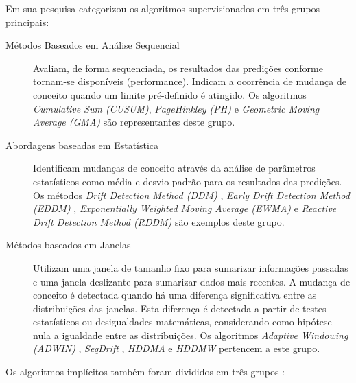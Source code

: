 \documentclass[qual, classic, a4paper]{ufbathesis}
\begin{document}
Em sua pesquisa \cite{Gama:2014:SCD:2597757.2523813} categorizou os algoritmos supervisionados em três grupos principais:

\begin{description}
    \item[Métodos Baseados em Análise Sequencial] Avaliam, de forma sequenciada, os resultados das predições conforme tornam-se disponíveis (performance).
    Indicam a ocorrência de mudança de conceito quando um limite pré-definido é atingido.
    Os algoritmos \textit{Cumulative Sum (CUSUM)}, \textit{PageHinkley (PH)} \cite{Page:CUSUM:PageHinkley:1954} e \textit{Geometric Moving Average (GMA)} \cite{Roberts:2000:CCT:338441.338464}
    são representantes deste grupo.

    \item[Abordagens baseadas em Estatística] Identificam mudanças de conceito através da análise de parâmetros estatísticos como média e desvio padrão para os resultados das predições.
    Os métodos \textit{Drift Detection Method (DDM)} \cite{GamaMCR04}, 
    \textit{Early Drift Detection Method (EDDM)} \cite{EDDM}, 
    \textit{Exponentially Weighted Moving Average (EWMA)} \cite{Ross:2012:EWM:2076039.2076307} e 
    \textit{Reactive Drift Detection Method (RDDM)} \cite{Barros:RDDM:2017} são exemplos deste grupo.

    \item[Métodos baseados em Janelas] Utilizam uma janela de tamanho fixo para sumarizar informações passadas e uma janela deslizante para sumarizar dados mais recentes.
    A mudança de conceito é detectada quando há uma diferença significativa entre as distribuições das janelas.
    Esta diferença é detectada a partir de testes estatísticos ou desigualdades matemáticas, considerando como hipótese nula a igualdade entre as distribuições.
    Os algoritmos 
    \textit{Adaptive Windowing (ADWIN)} \cite{BifetG07}, 
    \textit{SeqDrift} \cite{PearsSK14:SeqDrift:2014}, 
    \textit{HDDMA} e \textit{HDDMW} \cite{BlancoCRBDM15:HDDMA:HDDMW:2015}
    pertencem a este grupo.
\end{description}

Os algoritmos implícitos também foram divididos em três grupos \cite{GONCALVES20148144}:
\end{document}
